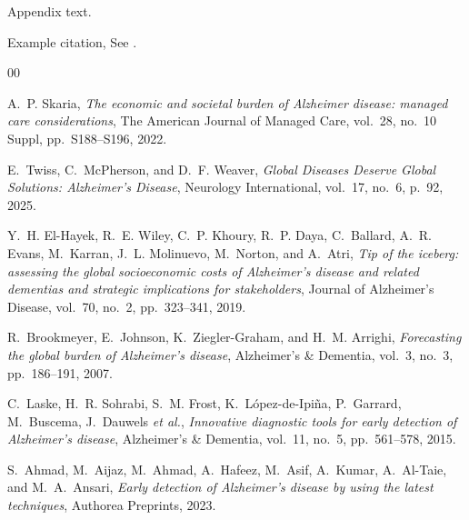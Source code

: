 \documentclass[final,5p,times]{elsarticle}
\begin{document}
Appendix text.


Example citation, See \cite{lamport94}.




\begin{thebibliography}{00}


A.~P. Skaria,
\textit{The economic and societal burden of Alzheimer disease: managed care considerations},
The American Journal of Managed Care,
vol.~28, no.~10 Suppl,
pp.~S188--S196,
2022.

E.~Twiss, C.~McPherson, and D.~F. Weaver,
\textit{Global Diseases Deserve Global Solutions: Alzheimer’s Disease},
Neurology International,
vol.~17, no.~6,
p.~92,
2025.


Y.~H. El-Hayek, R.~E. Wiley, C.~P. Khoury, R.~P. Daya, C.~Ballard, A.~R. Evans, M.~Karran, J.~L. Molinuevo, M.~Norton, and A.~Atri,
\textit{Tip of the iceberg: assessing the global socioeconomic costs of Alzheimer’s disease and related dementias and strategic implications for stakeholders},
Journal of Alzheimer’s Disease,
vol.~70, no.~2,
pp.~323--341,
2019.

R.~Brookmeyer, E.~Johnson, K.~Ziegler-Graham, and H.~M. Arrighi,
\textit{Forecasting the global burden of Alzheimer’s disease},
Alzheimer's \& Dementia,
vol.~3, no.~3,
pp.~186--191,
2007.

C.~Laske, H.~R. Sohrabi, S.~M. Frost, K.~López-de-Ipiña, P.~Garrard, M.~Buscema, J.~Dauwels \textit{et al.},
\textit{Innovative diagnostic tools for early detection of Alzheimer's disease},
Alzheimer's \& Dementia,
vol.~11, no.~5,
pp.~561--578,
2015.

S.~Ahmad, M.~Aijaz, M.~Ahmad, A.~Hafeez, M.~Asif, A.~Kumar, A.~Al-Taie, and M.~A.~Ansari,
\textit{Early detection of Alzheimer's disease by using the latest techniques},
Authorea Preprints,
2023.


\end{thebibliography}
\end{document}

